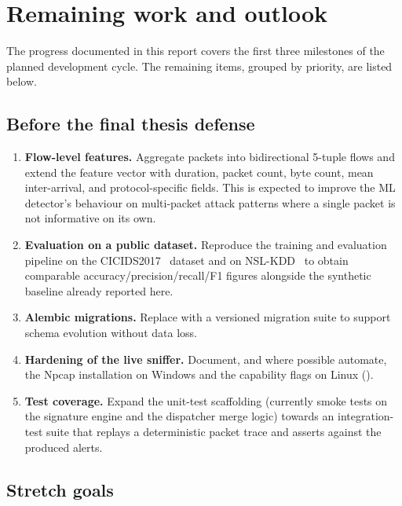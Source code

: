 \section{Remaining work and outlook}
\label{sec:future_work}

The progress documented in this report covers the first three milestones
of the planned development cycle. The remaining items, grouped by
priority, are listed below.

\subsection{Before the final thesis defense}

\begin{enumerate}
    \item \textbf{Flow-level features.} Aggregate packets into
        bidirectional 5-tuple flows and extend the feature vector with
        duration, packet count, byte count, mean inter-arrival, and
        protocol-specific fields. This is expected to improve the ML
        detector's behaviour on multi-packet attack patterns where a
        single packet is not informative on its own.
    \item \textbf{Evaluation on a public dataset.} Reproduce the
        training and evaluation pipeline on the
        CICIDS2017~\cite{sharafaldin2018cicids} dataset and on
        NSL-KDD~\cite{tavallaee2009detailed} to obtain comparable
        accuracy/precision/recall/F1 figures alongside the synthetic
        baseline already reported here.
    \item \textbf{Alembic migrations.} Replace
         with a versioned migration
        suite to support schema evolution without data loss.
    \item \textbf{Hardening of the live sniffer.} Document, and where
        possible automate, the Npcap installation on Windows and the
        capability flags on Linux ().
    \item \textbf{Test coverage.} Expand the unit-test scaffolding
        (currently smoke tests on the signature engine and the
        dispatcher merge logic) towards an integration-test suite that
        replays a deterministic packet trace and asserts against the
        produced alerts.
\end{enumerate}

\subsection{Stretch goals}

